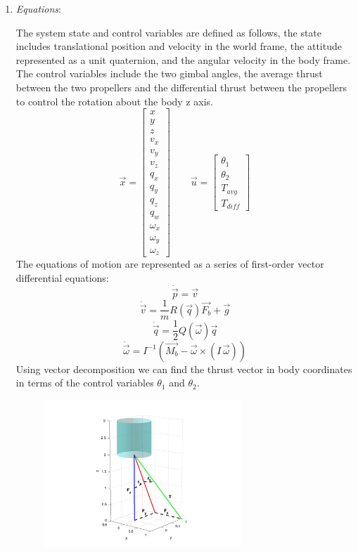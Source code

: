 \documentclass[]{article}
\begin{document}
	
	\begin{enumerate}
	\item {\em Equations}:
	
	The system state and control variables are defined as follows, the state includes translational position and velocity in the world frame, the attitude represented as a unit quaternion, and the angular velocity in the body frame. The control variables include the two gimbal angles, the average thrust between the two propellers and the differential thrust between the propellers to control the rotation about the body z axis.
        \[
        \vec{x} =
        \begin{bmatrix}
        x \\ y \\ z \\ v_x \\ v_y \\ v_z \\ q_x \\ q_y \\ q_z \\ q_w \\ \omega_x \\ \omega_y \\ \omega_z
        \end{bmatrix}
        \qquad
        \vec{u} =
        \begin{bmatrix}
        \theta_1 \\ \theta_2 \\ T_{avg} \\ T_{diff}
        \end{bmatrix}
        \]
        The equations of motion are represented as a series of first-order vector differential equations:
        	\[
		\dot{\vec{p}} = \vec{v}
	\]
	\[
		\dot{\vec{v}} = \frac{1}{m}R(\vec{q})\vec{F_b}+\vec{g}
	\]
	\[
		\dot{\vec{q}} = \frac{1}{2}Q(\vec{\omega})\vec{q}
	\]
	\[
		\dot{\vec{\omega}} = I^{-1}\!\left(\vec{M_b} - \vec{\omega} \times (I\,\vec{\omega})\right)
	\]
	Using vector decomposition we can find the thrust vector in body coordinates in terms of the control variables $\theta_1$ and $\theta_2$.	
	\begin{figure}[H]
	\centering
	\includegraphics[width=0.7\textwidth]{graph3d.jpg}

\end{figure}
\end{enumerate}
\end{document}
